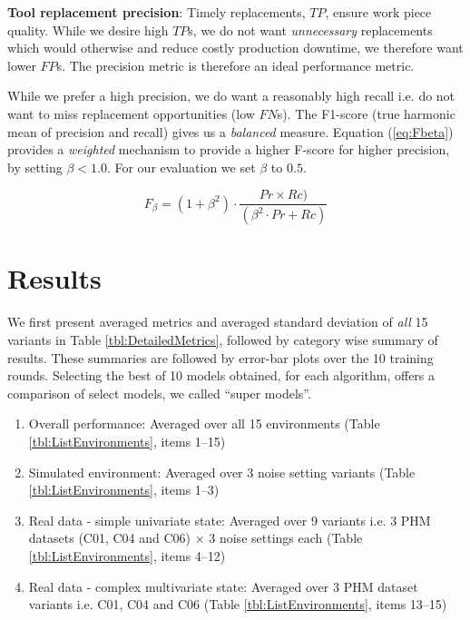 \documentclass[a4paper, 12pt]{article}
\begin{document}
\textbf{Tool replacement precision}: Timely replacements, $TP$, ensure work piece quality. While we desire high $TP$s, we do not want \textit{unnecessary} replacements which would otherwise and reduce costly production downtime, we therefore want lower $FP$s. The precision metric is therefore an ideal performance metric. 

While we prefer a high precision, we do want a reasonably high recall i.e. do not want to miss replacement opportunities (low $FN$s). The F1-score (true harmonic mean of precision and recall) gives us a \textit{balanced} measure. Equation (\ref{eq:Fbeta}) provides a \textit{weighted} mechanism to provide a higher F-score for higher precision, by setting $\beta < 1.0$. For our evaluation we set $\beta$ to $0.5$.

\begin{equation}
	F_{\beta} = (1+\beta^2) \cdot \frac{Pr \times Rc)}{(\beta^2 \cdot Pr + Rc)}
	\label{eq:Fbeta}
\end{equation}

%	

\section{Results}\label{sec:Results}
We first present averaged metrics and averaged standard deviation of \textit{all} 15 variants in Table \ref{tbl:DetailedMetrics}, followed by category wise summary of results. These summaries are followed by error-bar plots over the 10 training rounds. Selecting the best of 10 models obtained, for each algorithm, offers a comparison of select models, we called ``super models''. 

\begin{enumerate}
	\item Overall performance: Averaged over all 15 environments (Table \ref{tbl:ListEnvironments}, items 1--15)
	\item Simulated environment: Averaged over 3 noise setting variants (Table \ref{tbl:ListEnvironments}, items 1--3)
	\item Real data - simple univariate state: Averaged over 9 variants i.e. 3 PHM datasets (C01, C04 and C06) $\times$ 3 noise settings each (Table \ref{tbl:ListEnvironments}, items 4--12) 
	\item Real data - complex multivariate state: Averaged over 3 PHM dataset variants i.e. C01, C04 and C06 (Table \ref{tbl:ListEnvironments}, items 13--15)
\end{enumerate}
\end{document}
